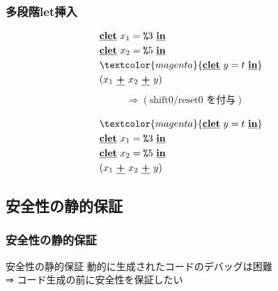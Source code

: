 \documentclass[dvipdfmx,cjk,xcolor=dvipsnames,envcountsect,notheorems,12pt]{beamer}
\newcommand\cPlus{\underline{\textbf{+}}}
\newcommand\cLet{\underline{\textbf{clet}}}
\newcommand\cIn{\underline{\textbf{in}}}
\newcommand\csp[1]{\texttt{\%}{#1}}
\newcommand\magenta[1]{\textcolor{magenta}{#1}}
\theoremstyle{definition}
\begin{document}
\begin{frame}
  \frametitle{多段階let挿入}
  \begin{align*}
    & \cLet~x_1=\csp{3}~\cIn \\
    & \cLet~x_2=\csp{5}~\cIn \\
    & \magenta{\cLet~y=t~\cIn} \\
    & (x_1~\cPlus~x_2~\cPlus~y)
  \end{align*}
  \pause
  \begin{align*}
    & \Rightarrow (\text{shift0/reset0 を付与})\\
  \end{align*}
  \pause
  \begin{align*}
    & \magenta{\cLet~y=t~\cIn} \\
    & \cLet~x_1=\csp{3}~\cIn \\
    & \cLet~x_2=\csp{5}~\cIn \\
    & (x_1~\cPlus~x_2~\cPlus~y)
  \end{align*}
\end{frame}
\subsection{安全性の静的保証}

\begin{frame}[fragile]
  \frametitle{安全性の静的保証}
  \begin{exampleblock}{安全性の静的保証}
    動的に生成されたコードのデバッグは困難\\
    ⇒ コード生成の前に安全性を保証したい
  \end{exampleblock}

\end{frame}
\end{document}
